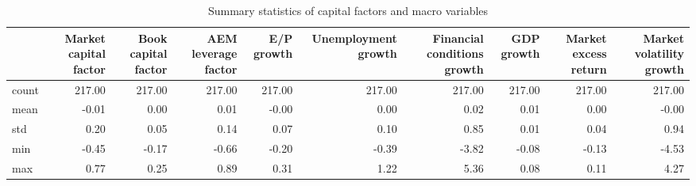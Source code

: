 \begin{table}
\caption{Summary statistics of capital factors and macro variables}
\label{tab:Table 3.1}
\begin{tabular}{lrrrrrrrrr}
\toprule
 & Market capital factor & Book capital factor & AEM leverage factor & E/P growth & Unemployment growth & Financial conditions growth & GDP growth & Market excess return & Market volatility growth \\
\midrule
count & 217.00 & 217.00 & 217.00 & 217.00 & 217.00 & 217.00 & 217.00 & 217.00 & 217.00 \\
mean & -0.01 & 0.00 & 0.01 & -0.00 & 0.00 & 0.02 & 0.01 & 0.00 & -0.00 \\
std & 0.20 & 0.05 & 0.14 & 0.07 & 0.10 & 0.85 & 0.01 & 0.04 & 0.94 \\
min & -0.45 & -0.17 & -0.66 & -0.20 & -0.39 & -3.82 & -0.08 & -0.13 & -4.53 \\
max & 0.77 & 0.25 & 0.89 & 0.31 & 1.22 & 5.36 & 0.08 & 0.11 & 4.27 \\
\bottomrule
\end{tabular}
\end{table}
